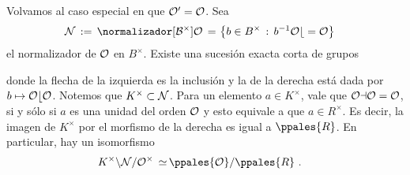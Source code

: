 Volvamos al caso especial en que $\cal{O}'=\cal{O}$. Sea
\begin{align*}
 \cal{N}\,:=\,\normalizador[B^{\times}]{\cal{O}} \,=\, &
	\left\lbrace b\in B^{\times}\,:\,b^{-1}\cal{O}b=\cal{O}
	\right\rbrace
\end{align*}
%
el normalizador de $\cal{O}$ en $B^{\times}$. %
Existe una sucesi\'{o}n exacta corta de grupos
\begin{center}
\quad\text{,}
\end{center}
%
donde %
la flecha de la izquierda es la inclusi\'{o}n y la de la derecha est\'{a}
dada por $b\mapsto\cal{O}b\cal{O}$. Notemos que
$K^{\times}\subset\cal{N}$. Para un elemento
$a\in K^{\times}$, vale que $\cal{O}a\cal{O}=\cal{O}$, si y s\'{o}lo si
$a$ es una unidad del orden $\cal{O}$ y esto equivale a que $a\in R^{\times}$.
Es decir, la imagen de $K^{\times}$ por el morfismo de la derecha es igual
a $\ppales{R}$. En particular, hay un isomorfismo
\begin{align*}
	K^{\times}\backslash \cal{N}/\cal{O}^{\times}
	\,\simeq\, & \ppales{\cal{O}}/\ppales{R}
	\text{ .}
\end{align*}
%

